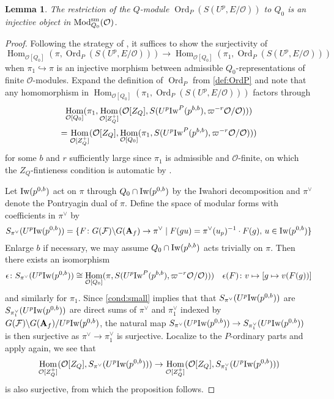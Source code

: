 \documentclass[leqno]{amsart}
\newtheorem{lem}[thm]{Lemma}
\theoremstyle{definition}
\theoremstyle{remark}
\newcommand{\oo}{\mathcal{O}}
\newcommand{\A}{\mathbf A}
\DeclareMathOperator{\Hom}{Hom}
\DeclareMathOperator{\Mod}{\textnormal{Mod}}
\DeclareMathOperator{\Ord}{Ord} %
\newcommand{\sm}{\textnormal{sm}}
\newcommand{\F}{{\mathcal{F}}} %
\newcommand{\Iw}{\textnormal{Iw}} %
\begin{document}
\begin{lem}\label{lem:inj}
	The restriction of the $Q$-module
	$\Ord_P(S(U^p,E/\oo))$ to $Q_0$ 
	is an injective object
	in $\Mod^{\sm}_{Q_0}(\oo)$.
\end{lem}
\begin{proof}
	Following the strategy of 
	\cite[Prop 3.2.4]{pan}, 
	it suffices to show the surjectivity of
	\[
		\Hom_{\oo[Q_0]}(\pi,\Ord_P(S(U^p,E/\oo)))\to 
		\Hom_{\oo[Q_0]}(\pi_1,\Ord_P(S(U^p,E/\oo)))
	\]
	when $\pi_{1}\hookrightarrow \pi$ 
	is an injective morphism between admissible 
    $Q_0$-representations of finite $\oo$-modules.
    Expand the definition of $\Ord_P$ from \eqref{def:OrdP}
    and note that any homomorphism  in 
    $\Hom_{\oo[Q_0]}(\pi_1,\Ord_P(S(U^p,E/\oo)))$ factors through
	\begin{multline*}
		\Hom_{\oo[Q_0]}(\pi_1,
		\Hom_{\oo[Z_Q^+]}
		(\oo[Z_Q], S(U^p\Iw^P(p^{b,b}),
		\varpi^{-r}\oo/\oo)))\\=
		\Hom_{\oo[Z_Q^+]}(\oo[Z_Q],
		\Hom_{\oo[Q_0]}(\pi_1, 
		S(U^p\Iw^P(p^{b,b}),\varpi^{-r}\oo/\oo)))
	\end{multline*}
	for some $b$ and $r$ sufficiently large
    since $\pi_1$ is admissible and $\oo$-finite,
	on which 
	the $Z_Q$-fintieness condition is automatic
	by \cite[Lem 3.1.5]{emeI}.

    Let $\Iw(p^{0,b})$ 
    act on $\pi$ through $Q_0\cap \Iw(p^{0,b})$
    by the Iwahori decomposition
    and $\pi^\vee$ denote the Pontryagin dual of $\pi$.
	Define the space of modular forms with
    coefficients in $\pi^\vee$ by
	\[
		S_{\pi^\vee}(U^p\Iw(p^{0,b}))=
		\{
			F\colon G(\F)\backslash G(\A_f)\to 
			\pi^\vee\mid 
			F(gu)=\pi^\vee(u_p)^{-1}\cdot F(g),\,
			u\in \Iw(p^{0,b})
		\}
	\]
	Enlarge $b$ if necessary, we may assume
	$Q_0\cap \Iw(p^{b,b})$ acts trivially on $\pi$.
	Then there exists an isomorphism
	\[
		\epsilon\colon 
		S_{\pi^\vee}(U^p\Iw(p^{0,b}))\cong 
		\Hom_{\oo[Q_0]}(\pi,
		S(U^p\Iw^P(p^{b,b}),\varpi^{-r}\oo/\oo)))
		\quad \epsilon(F)\colon
		v\mapsto [g\mapsto v(F(g))]
	\]
	and similarly for $\pi_1$.
    Since \eqref{cond:small} implies that
	that $S_{\pi^\vee}(U^p\Iw(p^{0,b}))$
	are $S_{\pi_1^\vee}(U^p\Iw(p^{0,b}))$
	are direct sums of 
	$\pi^\vee$ and  $\pi_1^\vee$
    indexed by
	$G(\F)\backslash G(\A_f)/U^p\Iw(p^{0,b})$,
    the natural map
	$S_{\pi^\vee}(U^p\Iw(p^{0,b}))\to 
	S_{\pi_1^\vee}(U^p\Iw(p^{0,b}))$ is then
	surjective
	as $\pi^\vee\to \pi_1^\vee$ is surjective.
	Localize to the $P$-ordinary parts
	and apply \cite[Lem 3.1.5]{emeI} again,
	we see that
	\[
		\Hom_{\oo[Z_Q^+]}(\oo[Z_Q],
		S_{\pi^\vee}(U^p\Iw(p^{0,b})))\to 
		\Hom_{\oo[Z_Q^+]}(\oo[Z_Q],
		S_{\pi^\vee_1}(U^p\Iw(p^{0,b})))
	\]
	is also surjective, from which 
	the proposition follows.
\end{proof}
\end{document}

